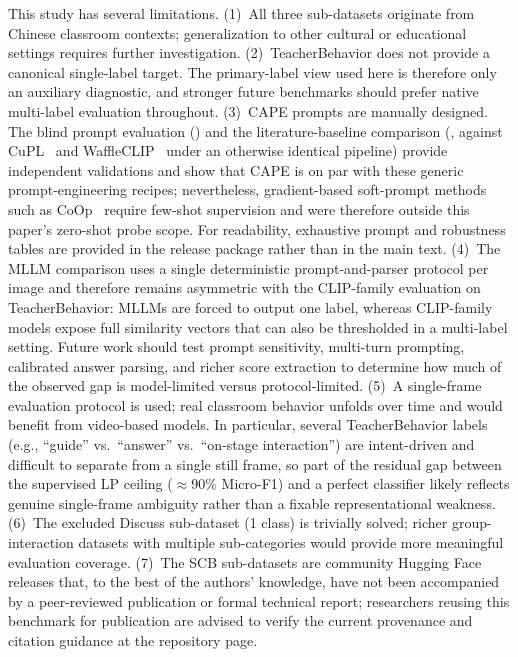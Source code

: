 \documentclass[symmetry,article,submit,pdftex,moreauthors]{Definitions/mdpi}
\begin{document}
This study has several limitations.
\label{sec:limitations}
(1)~All three sub-datasets originate from Chinese classroom contexts; generalization to other cultural or educational settings requires further investigation.
(2)~TeacherBehavior does not provide a canonical single-label target. The primary-label view used here is therefore only an auxiliary diagnostic, and stronger future benchmarks should prefer native multi-label evaluation throughout.
(3)~CAPE prompts are manually designed. The blind prompt evaluation () and the literature-baseline comparison (, against CuPL~\cite{pratt2023cupl} and WaffleCLIP~\cite{roth2023waffleclip} under an otherwise identical pipeline) provide independent validations and show that CAPE is on par with these generic prompt-engineering recipes; nevertheless, gradient-based soft-prompt methods such as CoOp~\cite{zhou2022learning} require few-shot supervision and were therefore outside this paper's zero-shot probe scope. For readability, exhaustive prompt and robustness tables are provided in the release package rather than in the main text.
(4)~The MLLM comparison uses a single deterministic prompt-and-parser protocol per image and therefore remains asymmetric with the CLIP-family evaluation on TeacherBehavior: MLLMs are forced to output one label, whereas CLIP-family models expose full similarity vectors that can also be thresholded in a multi-label setting. Future work should test prompt sensitivity, multi-turn prompting, calibrated answer parsing, and richer score extraction to determine how much of the observed gap is model-limited versus protocol-limited.
(5)~A single-frame evaluation protocol is used; real classroom behavior unfolds over time and would benefit from video-based models. In particular, several TeacherBehavior labels (e.g., ``guide'' vs.\ ``answer'' vs.\ ``on-stage interaction'') are intent-driven and difficult to separate from a single still frame, so part of the residual gap between the supervised LP ceiling ($\approx$90\% Micro-F1) and a perfect classifier likely reflects genuine single-frame ambiguity rather than a fixable representational weakness.
(6)~The excluded Discuss sub-dataset (1 class) is trivially solved; richer group-interaction datasets with multiple sub-categories would provide more meaningful evaluation coverage.
(7)~The SCB sub-datasets are community Hugging Face releases that, to the best of the authors' knowledge, have not been accompanied by a peer-reviewed publication or formal technical report; researchers reusing this benchmark for publication are advised to verify the current provenance and citation guidance at the repository page.
\end{document}
